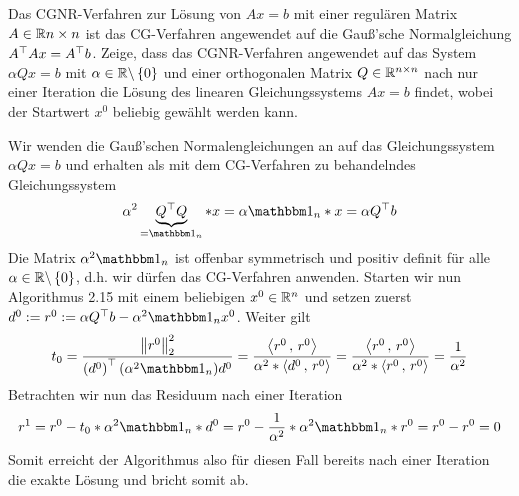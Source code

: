 \begin{exercisePage}[CG-Verfahren]
	\setcounter{taskcount}{4}
	\begin{homework}
		Das CGNR-Verfahren zur Lösung von $Ax = b$ mit einer regulären Matrix $A \in \mathbb{R}{n \times n}$ ist das CG-Verfahren angewendet auf die Gauß'sche Normalgleichung $A^{\top} A x = A^{\top} b$. Zeige, dass das CGNR-Verfahren angewendet auf das System $\alpha Q x = b$ mit $\alpha \in \mathbb{R}\backslash \left\{ 0 \right\}$ und einer orthogonalen Matrix $Q \in \mathbb{R}^{n \times n}$ nach nur einer Iteration die Lösung des linearen Gleichungssystems $A x = b$ findet, wobei der Startwert $x^0$ beliebig gewählt werden kann.
	\end{homework}
	
	Wir wenden die Gauß'schen Normalengleichungen an auf das Gleichungssystem $\alpha Q x = b$ und erhalten als mit dem CG-Verfahren zu behandelndes Gleichungssystem
	\begin{equation*}
		\alpha^2 \underbrace{\trans{Q}Q}_{= \one_n} * x 
		= \alpha \one_n * x = \alpha \trans{Q} b
	\end{equation*}
	Die Matrix $\alpha^2 \one_n$ ist offenbar symmetrisch und positiv definit für alle $\alpha \in \mathbb{R}\backslash \left\{ 0 \right\}$, d.h. wir dürfen das CG-Verfahren anwenden. Starten wir nun Algorithmus 2.15 mit einem beliebigen $x^0 \in \mathbb{R}^n$ und setzen zuerst $d^0 \defeq r^0 \defeq \alpha \trans{Q} b - \alpha^2 \one_n x^0$. Weiter gilt
	\begin{equation*}
		t_0 
		= \frac{\norm{r^0}_2^2}{\transpose{d^0} (\alpha^2 \one_n) d^0} 
		= \frac{\scal{r^0}{r^0}}{\alpha^2 * \scal{d^0}{r^0}}
		= \frac{\scal{r^0}{r^0}}{\alpha^2 * \scal{r^0}{r^0}}
		= \frac{1}{\alpha^2}
	\end{equation*}
	Betrachten wir nun das Residuum nach einer Iteration
	\begin{equation*}
		r^1
		= r^0 - t_0 * \alpha^2 \one_n * d^0 
		= r^0 - \frac{1}{\alpha^2} * \alpha^2 \one_n * r^0 
		= r^0 - r^0
		= 0
	\end{equation*}
	Somit erreicht der Algorithmus also für diesen Fall bereits nach einer Iteration die exakte Lösung und bricht somit ab.
\end{exercisePage}